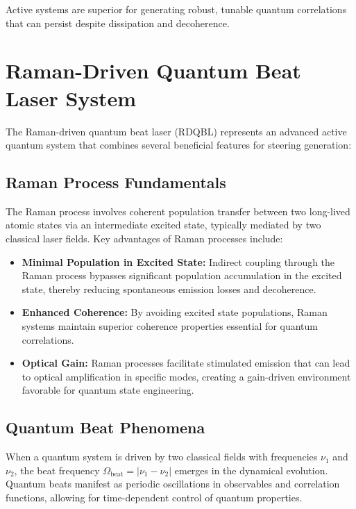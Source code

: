 Active systems are superior for generating robust, tunable quantum correlations that can persist despite dissipation and decoherence.

\section{Raman-Driven Quantum Beat Laser System}

The Raman-driven quantum beat laser (RDQBL) represents an advanced active quantum system that combines several beneficial features for steering generation:

\subsection{Raman Process Fundamentals}

The Raman process involves coherent population transfer between two long-lived atomic states via an intermediate excited state, typically mediated by two classical laser fields. Key advantages of Raman processes include:

\begin{itemize}
	\item \textbf{Minimal Population in Excited State:} Indirect coupling through the Raman process bypasses significant population accumulation in the excited state, thereby reducing spontaneous emission losses and decoherence.

	\item \textbf{Enhanced Coherence:} By avoiding excited state populations, Raman systems maintain superior coherence properties essential for quantum correlations.

	\item \textbf{Optical Gain:} Raman processes facilitate stimulated emission that can lead to optical amplification in specific modes, creating a gain-driven environment favorable for quantum state engineering.
\end{itemize}

\subsection{Quantum Beat Phenomena}

When a quantum system is driven by two classical fields with frequencies $\nu_1$ and $\nu_2$, the beat frequency $\Omega_{\text{beat}} = |\nu_1 - \nu_2|$ emerges in the dynamical evolution. Quantum beats manifest as periodic oscillations in observables and correlation functions, allowing for time-dependent control of quantum properties.

